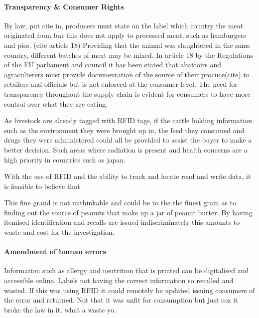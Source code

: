 \documentclass[a4paper, 11pt]{article}
\begin{document}
\paragraph{Transparency \& Consumer Rights}
By law, put cite in, producers must state on the label which country the meat originated from but this does not apply to processed meat, such as hamburgers and pies. (cite article 18) Providing that the animal was slaughtered in the same country, different batches of meat may be mixed. In article 18 by the Regulations of the EU parliament and council it has been stated that abattoirs and agraculterers must provide documentation of the source of their procuce(cite) to retailers and officials but is not enforced at the consumer level. The need for transparency throughout the supply chain is evident for consumers to have more control over what they are eating. 

As livestock are already tagged with RFID tags, if the cattle holding information such as the environment they were brought up in, the feed they consumed and drugs they were administered could all be provided to assist the buyer to make a better decision. Such areas where radiation is present and health concerns are a high priority in countries such as japan.  

With the use of RFID and the ability to track and locate read and write data, it is feasible to believe that

This fine grand is not unthinkable and could be to the the finest grain as to finding out the source of peanuts that make up a jar of peanut butter. By having itemised identification and recalls are issued indiscriminately this amounts to waste and cost for the investigation.

\paragraph{Amendment of human errors}
Information such as allergy and neutrition that is printed can be digitalised and accessible online. Labels not having the correct information so recalled and wasted. If this was using RFID it could remotely be updated issuing consumers of the error and returned. Not that it was unfit for consumption but just coz it broke the law in it. what a waste yo.
\end{document}
